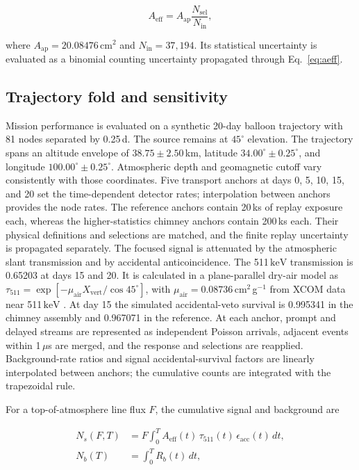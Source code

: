 \documentclass[11pt]{article}
\newcommand{\keV}{\ensuremath{\,\mathrm{keV}}\xspace}
\newcommand{\aeff}{\ensuremath{A_{\mathrm{eff}}}}
\begin{document}
\begin{equation}
  \aeff=A_{\mathrm{ap}}\frac{N_{\mathrm{sel}}}{N_{\mathrm{in}}},
  \label{eq:aeff}
\end{equation}

where $A_{\mathrm{ap}}=20.08476$\,cm$^2$ and
$N_{\mathrm{in}}=37{,}194$. Its statistical uncertainty is evaluated as a
binomial counting uncertainty propagated through Eq.~\eqref{eq:aeff}.

\subsection{Trajectory fold and sensitivity}
\label{sec:mission}

Mission performance is evaluated on a synthetic 20-day balloon trajectory with
81 nodes separated by 0.25\,d. The source remains at $45^{\circ}$ elevation.
The trajectory spans an altitude envelope of $38.75\pm2.50$\,km, latitude
$34.00^{\circ}\pm0.25^{\circ}$, and longitude
$100.00^{\circ}\pm0.25^{\circ}$. Atmospheric depth and geomagnetic cutoff vary
consistently with those coordinates. Five transport anchors at
days 0, 5, 10, 15, and 20 set the time-dependent detector rates; interpolation
between anchors provides the node rates. The reference anchors contain 20\,ks
of replay exposure each, whereas the higher-statistics chimney anchors contain
200\,ks each. Their physical definitions and selections are matched, and the
finite replay uncertainty is propagated separately. The focused signal is attenuated by
the atmospheric slant transmission and by accidental anticoincidence. The
511\keV transmission is 0.65203 at days 15 and 20. It is calculated in a
plane-parallel dry-air model as
$\tau_{511}=\exp[-\mu_{\mathrm{air}}X_{\mathrm{vert}}/\cos45^{\circ}]$, with
$\mu_{\mathrm{air}}=0.08736$\,cm$^2$\,g$^{-1}$ from XCOM data near 511\keV
\citep{NISTXCOM}. At day 15 the simulated
accidental-veto survival is 0.995341 in the chimney assembly and 0.967071 in the
reference. At each anchor, prompt and delayed streams are represented as
independent Poisson arrivals, adjacent events within 1\,$\mu$s are merged, and
the response and selections are reapplied. Background-rate ratios and signal
accidental-survival factors are linearly interpolated between anchors; the
cumulative counts are integrated with the trapezoidal rule.

For a top-of-atmosphere line flux $F$, the cumulative signal and background are

\begin{align}
  N_s(F,T) &= F\int_0^T \aeff(t)\,\tau_{511}(t)\,
                   \epsilon_{\mathrm{acc}}(t)\,dt, \\
  N_b(T) &= \int_0^T R_b(t)\,dt,
  \label{eq:counts}
\end{align}
\end{document}
